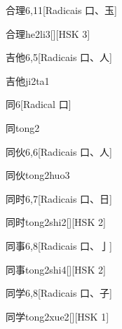 \begin{entry}{合理}{6,11}[Radicais ⼝、⽟]
  \begin{phonetics}{合理}{he2li3}[][HSK 3]
  \end{phonetics}
\end{entry}

\begin{entry}{吉他}{6,5}[Radicais ⼝、⼈]
  \begin{phonetics}{吉他}{ji2ta1}
  \end{phonetics}
\end{entry}

\begin{entry}{同}{6}[Radical ⼝]
  \begin{phonetics}{同}{tong2}
  \end{phonetics}
\end{entry}

\begin{entry}{同伙}{6,6}[Radicais ⼝、⼈]
  \begin{phonetics}{同伙}{tong2huo3}
  \end{phonetics}
\end{entry}

\begin{entry}{同时}{6,7}[Radicais ⼝、⽇]
  \begin{phonetics}{同时}{tong2shi2}[][HSK 2]
  \end{phonetics}
\end{entry}

\begin{entry}{同事}{6,8}[Radicais ⼝、⼅]
  \begin{phonetics}{同事}{tong2shi4}[][HSK 2]
  \end{phonetics}
\end{entry}

\begin{entry}{同学}{6,8}[Radicais ⼝、⼦]
  \begin{phonetics}{同学}{tong2xue2}[][HSK 1]
  \end{phonetics}
\end{entry}

